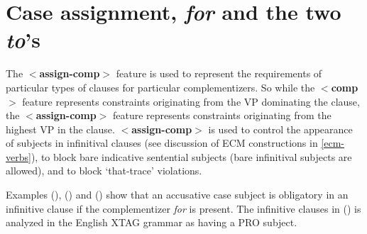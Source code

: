 
\section{Case assignment, {\it for\/} and the two {\it to\/}'s}
\label{for-complementizer}

The {\bf $<$assign-comp$>$} feature is used to represent the
requirements of particular types of clauses for particular
complementizers.  So while the {\bf $<$comp$>$} feature represents
constraints originating from the VP dominating the clause, the {\bf
$<$assign-comp$>$} feature represents constraints originating from the
highest VP in the clause. {\bf $<$assign-comp$>$} is used to control
the appearance of subjects in infinitival clauses (see discussion of
ECM constructions in \ref{ecm-verbs}), to block bare indicative
sentential subjects (bare infinitival subjects are allowed), and to
block `that-trace' violations.

Examples (), () and () show that an accusative
case subject is obligatory in an infinitive clause if the
complementizer {\it for\/} is present. The infinitive clauses in
() is analyzed in the English XTAG grammar as
having a PRO subject.  


 
